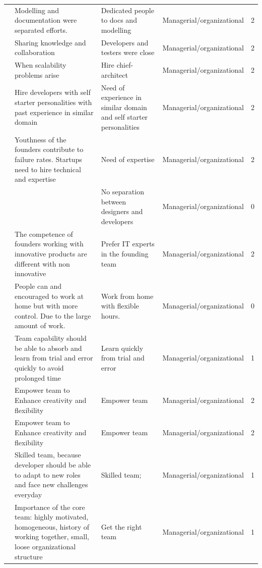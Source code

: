 \documentclass[final,5p,times,twocolumn]{elsarticle}
\begin{document}
\begin{center}
\begin{longtable}{|p{0.4in}|p{3in}|p{1.3in}|p{1in}|p{0.3in}|}
\cite{Ambler2002} & Modelling and documentation were separated efforts. & Dedicated people to docs and modelling & Managerial/organizational & 2 \\
\cite{Ambler2002} & Sharing knowledge and collaboration & Developers and testers were close & Managerial/organizational & 2 \\
\cite{Ambler2002} & When scalability problems arise & Hire chief-architect & Managerial/organizational & 2 \\
\cite{Yoffie1999} & Hire developers with self starter personalities with past experience in similar domain & Need of experience in similar domain and self starter personalities & Managerial/organizational & 2 \\
\cite{Yoffie1999} & Youthness of the founders contribute to failure rates. Startups need to hire technical and expertise & Need of expertise & Managerial/organizational & 2 \\
\cite{Tanabian2005} &       & No separation between designers and developers & Managerial/organizational & 0 \\
\cite{Hasel2010} & The competence of founders working with innovative products are different with non innovative & Prefer IT experts in the founding team & Managerial/organizational & 2 \\
\cite{Tanabian2005} & People can and encouraged to work at home but with more control. Due to the large amount of work. & Work from home with flexible hours. & Managerial/organizational & 0 \\
\cite{Midler2008} & Team capability should be able to absorb and learn from trial and error quickly to avoid prolonged time & Learn quickly from trial and error & Managerial/organizational & 1 \\
\cite{Coleman2008} & Empower  team to Enhance creativity and flexibility & Empower team & Managerial/organizational & 2 \\
\cite{Coleman2008a} & Empower  team to Enhance creativity and flexibility & Empower team & Managerial/organizational & 2 \\
\cite{Sutton2000} & Skilled team, because developer should be able to adapt to new roles and face new challenges everyday & Skilled team; & Managerial/organizational & 1 \\
\cite{Camel1994a} & Importance of the core team: highly motivated, homogeneous, history of working together, small, loose organizational structure & Get the right team & Managerial/organizational & 1 \\

\end{longtable}
\end{center}
\end{document}

